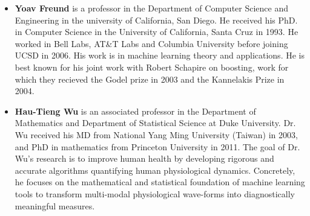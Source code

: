 \begin{itemize}
\item {\bf Yoav Freund} is a professor in the Department of Computer
  Science and Engineering in the university of California, San
  Diego. He received his PhD. in Computer Science in the University of
  California, Santa Cruz in 1993.  He worked in Bell Labs, AT\&T Labs
  and Columbia University before joining UCSD in 2006. His work is in
  machine learning theory and applications. He is best known for his
  joint work with Robert Schapire on boosting, work for which they recieved
  the Godel prize in 2003 and the Kannelakis Prize in 2004.

\item {\bf Hau-Tieng Wu} is an associated professor in the Department
  of Mathematics and Department of Statistical Science at Duke
  University. Dr. Wu received his MD from National Yang Ming
  University (Taiwan) in 2003, and PhD in mathematics from Princeton
  University in 2011. The goal of Dr. Wu's research is to improve
  human health by developing rigorous and accurate algorithms
  quantifying human physiological dynamics.  Concretely, he focuses on
  the mathematical and statistical foundation of machine learning
  tools to transform multi-modal physiological wave-forms into
  diagnostically meaningful measures.
\end{itemize}